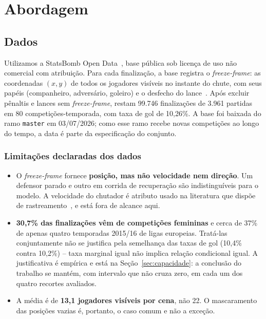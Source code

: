 \documentclass[12pt]{article}
\begin{document}
\section{Abordagem}

\subsection{Dados}

Utilizamos a StatsBomb Open Data~\cite{statsbomb}, base pública sob licença de uso
não comercial com atribuição. Para cada finalização, a base registra o \emph{freeze-frame}: as
coordenadas $(x,y)$ de todos os jogadores visíveis no instante do chute, com
seus papéis (companheiro, adversário, goleiro) e o desfecho do lance~\cite{statsbomb2021freezeframes}. Após
excluir pênaltis e lances sem \emph{freeze-frame}, restam 99.746 finalizações de
3.961 partidas em 80 competições-temporada, com taxa de gol de 10,26\%. A base
foi baixada do ramo \texttt{master} em 03/07/2026; como esse ramo recebe novas
competições ao longo do tempo, a data é parte da especificação do conjunto.

\subsubsection*{Limitações declaradas dos dados}

\begin{itemize}
  \item O \emph{freeze-frame} fornece \textbf{posição, mas não velocidade nem
        direção}. Um defensor parado e outro em corrida de recuperação são
        indistinguíveis para o modelo. A velocidade do chutador é atributo usado na literatura que dispõe de rastreamento~\cite{anzer2021goal,lucey2015quality}, e está fora de alcance aqui.
  \item \textbf{30,7\% das finalizações vêm de competições femininas} e cerca de
        37\% de apenas quatro temporadas 2015/16 de ligas europeias. Tratá-las
        conjuntamente não se justifica pela semelhança das taxas de gol (10,4\%
        contra 10,2\%) -- taxa marginal igual não implica relação condicional
        igual. A justificativa é empírica e está na Seção~\ref{sec:capacidade}:
        a conclusão do trabalho se mantém, com intervalo que não cruza zero, em
        cada um dos quatro recortes avaliados.
  \item A média é de \textbf{13,1 jogadores visíveis por cena}, não 22. O
        mascaramento das posições vazias é, portanto, o caso comum e não a
        exceção.
\end{itemize}
\end{document}

